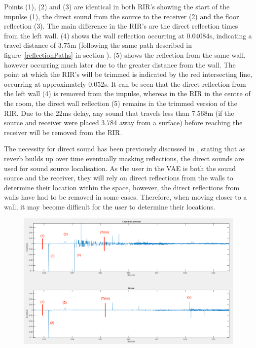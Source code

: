 \documentclass[../../main.tex]{subfiles}
\begin{document}
		Points (1), (2) and (3) are identical in both \ac{RIR}'s showing the start of the impulse (1), the direct sound from the source to the receiver (2) and the floor reflection (3). The main difference in the \ac{RIR}'s are the direct reflection times from the left wall. (4) shows the wall reflection occurring at 0.04084s, indicating a travel distance of 3.75m (following the same path described in figure~\ref{reflectionPaths} in section ). (5) shows the reflection from the same wall, however occurring much later due to the greater distance from the wall. The point at which the \ac{RIR}'s will be trimmed is indicated by the red intersecting line, occurring at approximately 0.052s. It can be seen that the direct reflection from the left wall (4) is removed from the impulse, whereas in the \ac{RIR} in the centre of the room, the direct wall reflection (5) remains in the trimmed version of the \ac{RIR}. Due to the 22ms delay, any sound that travels less than 7.568m (if the source and receiver were placed 3.784 away from a surface) before reaching the receiver will be removed from the \ac{RIR}. 

		The necessity for direct sound has been previously discussed in \cite{Devore2009}, stating that as reverb builds up over time eventually masking reflections, the direct sounds are used for sound source localisation. As the user in the \ac{VAE} is both the sound source and the receiver, they will rely on direct reflections from the walls to determine their location within the space, however, the direct reflections from walls have had to be removed in some cases. Therefore, when moving closer to a wall, it may become difficult for the user to determine their locations.

		\begin{figure}
			\centerline{\includegraphics[width=\textwidth]{Sections/Implementation/Max/images/Latency/odeonLatency_edit.png}}
			\caption{}
			\label{odeonTrim}
		\end{figure}
\end{document}
